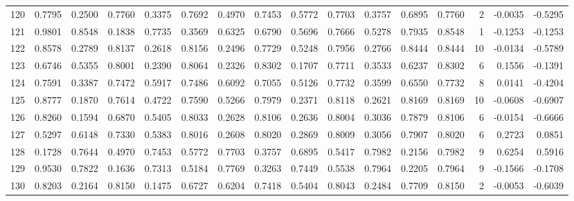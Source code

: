 \begin{tabular}{lrrrrrrrrrrrrrrr}
120 &      0.7795 &  0.2500 &  0.7760 &  0.3375 &  0.7692 &  0.4970 &  0.7453 &  0.5772 &  0.7703 &  0.3757 &   0.6895 &     0.7760 &      2 &                   -0.0035 &                    -0.5295 \\
121 &      0.9801 &  0.8548 &  0.1838 &  0.7735 &  0.3569 &  0.6325 &  0.6790 &  0.5696 &  0.7666 &  0.5278 &   0.7935 &     0.8548 &      1 &                   -0.1253 &                    -0.1253 \\
122 &      0.8578 &  0.2789 &  0.8137 &  0.2618 &  0.8156 &  0.2496 &  0.7729 &  0.5248 &  0.7956 &  0.2766 &   0.8444 &     0.8444 &     10 &                   -0.0134 &                    -0.5789 \\
123 &      0.6746 &  0.5355 &  0.8001 &  0.2390 &  0.8064 &  0.2326 &  0.8302 &  0.1707 &  0.7711 &  0.3533 &   0.6237 &     0.8302 &      6 &                    0.1556 &                    -0.1391 \\
124 &      0.7591 &  0.3387 &  0.7472 &  0.5917 &  0.7486 &  0.6092 &  0.7055 &  0.5126 &  0.7732 &  0.3599 &   0.6550 &     0.7732 &      8 &                    0.0141 &                    -0.4204 \\
125 &      0.8777 &  0.1870 &  0.7614 &  0.4722 &  0.7590 &  0.5266 &  0.7979 &  0.2371 &  0.8118 &  0.2621 &   0.8169 &     0.8169 &     10 &                   -0.0608 &                    -0.6907 \\
126 &      0.8260 &  0.1594 &  0.6870 &  0.5405 &  0.8033 &  0.2628 &  0.8106 &  0.2636 &  0.8004 &  0.3036 &   0.7879 &     0.8106 &      6 &                   -0.0154 &                    -0.6666 \\
127 &      0.5297 &  0.6148 &  0.7330 &  0.5383 &  0.8016 &  0.2608 &  0.8020 &  0.2869 &  0.8009 &  0.3056 &   0.7907 &     0.8020 &      6 &                    0.2723 &                     0.0851 \\
128 &      0.1728 &  0.7644 &  0.4970 &  0.7453 &  0.5772 &  0.7703 &  0.3757 &  0.6895 &  0.5417 &  0.7982 &   0.2156 &     0.7982 &      9 &                    0.6254 &                     0.5916 \\
129 &      0.9530 &  0.7822 &  0.1636 &  0.7313 &  0.5184 &  0.7769 &  0.3263 &  0.7449 &  0.5538 &  0.7964 &   0.2205 &     0.7964 &      9 &                   -0.1566 &                    -0.1708 \\
130 &      0.8203 &  0.2164 &  0.8150 &  0.1475 &  0.6727 &  0.6204 &  0.7418 &  0.5404 &  0.8043 &  0.2484 &   0.7709 &     0.8150 &      2 &                   -0.0053 &                    -0.6039 \\

\end{tabular}
